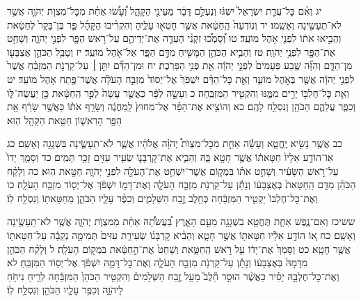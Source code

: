 \documentclass[twoside, openany, parskip=half, 11pt]{book}
\begin{document}
יג וְאִ֨ם כׇּל־עֲדַ֤ת יִשְׂרָאֵל֙ יִשְׁגּ֔וּ וְנֶעְלַ֣ם דָּבָ֔ר מֵעֵינֵ֖י הַקָּהָ֑ל וְ֠עָשׂ֠וּ אַחַ֨ת מִכׇּל־מִצְוֺ֧ת יְהֹוָ֛ה אֲשֶׁ֥ר לֹא־תֵעָשֶׂ֖ינָה וְאָשֵֽׁמוּ׃ יד וְנֽוֹדְעָה֙ הַֽחַטָּ֔את אֲשֶׁ֥ר חָטְא֖וּ עָלֶ֑יהָ וְהִקְרִ֨יבוּ הַקָּהָ֜ל פַּ֤ר בֶּן־בָּקָר֙ לְחַטָּ֔את וְהֵבִ֣יאוּ אֹת֔וֹ לִפְנֵ֖י אֹ֥הֶל מוֹעֵֽד׃ טו וְ֠סָמְכ֠וּ זִקְנֵ֨י הָעֵדָ֧ה אֶת־יְדֵיהֶ֛ם עַל־רֹ֥אשׁ הַפָּ֖ר לִפְנֵ֣י יְהֹוָ֑ה וְשָׁחַ֥ט אֶת־הַפָּ֖ר לִפְנֵ֥י יְהֹוָֽה׃ טז וְהֵבִ֛יא הַכֹּהֵ֥ן הַמָּשִׁ֖יחַ מִדַּ֣ם הַפָּ֑ר אֶל־אֹ֖הֶל מוֹעֵֽד׃ יז וְטָבַ֧ל הַכֹּהֵ֛ן אֶצְבָּע֖וֹ מִן־הַדָּ֑ם וְהִזָּ֞ה שֶׁ֤בַע פְּעָמִים֙ לִפְנֵ֣י יְהֹוָ֔ה אֵ֖ת פְּנֵ֥י הַפָּרֹֽכֶת׃ יח וּמִן־הַדָּ֞ם יִתֵּ֣ן ׀ עַל־קַרְנֹ֣ת הַמִּזְבֵּ֗חַ אֲשֶׁר֙ לִפְנֵ֣י יְהֹוָ֔ה אֲשֶׁ֖ר בְּאֹ֣הֶל מוֹעֵ֑ד וְאֵ֣ת כׇּל־הַדָּ֗ם יִשְׁפֹּךְ֙ אֶל־יְסוֹד֙ מִזְבַּ֣ח הָעֹלָ֔ה אֲשֶׁר־פֶּ֖תַח אֹ֥הֶל מוֹעֵֽד׃ יט וְאֵ֥ת כׇּל־חֶלְבּ֖וֹ יָרִ֣ים מִמֶּ֑נּוּ וְהִקְטִ֖יר הַמִּזְבֵּֽחָה׃ כ וְעָשָׂ֣ה לַפָּ֔ר כַּאֲשֶׁ֤ר עָשָׂה֙ לְפַ֣ר הַֽחַטָּ֔את כֵּ֖ן יַעֲשֶׂה־לּ֑וֹ וְכִפֶּ֧ר עֲלֵהֶ֛ם הַכֹּהֵ֖ן וְנִסְלַ֥ח לָהֶֽם׃ כא וְהוֹצִ֣יא אֶת־הַפָּ֗ר אֶל־מִחוּץ֙ לַֽמַּחֲנֶ֔ה וְשָׂרַ֣ף אֹת֔וֹ כַּאֲשֶׁ֣ר שָׂרַ֔ף אֵ֖ת הַפָּ֣ר הָרִאשׁ֑וֹן חַטַּ֥את הַקָּהָ֖ל הֽוּא׃

כב אֲשֶׁ֥ר נָשִׂ֖יא יֶֽחֱטָ֑א וְעָשָׂ֡ה אַחַ֣ת מִכׇּל־מִצְוֺת֩ יְהֹוָ֨ה אֱלֹהָ֜יו אֲשֶׁ֧ר לֹא־תֵעָשֶׂ֛ינָה בִּשְׁגָגָ֖ה וְאָשֵֽׁם׃ כג אֽוֹ־הוֹדַ֤ע אֵלָיו֙ חַטָּאת֔וֹ אֲשֶׁ֥ר חָטָ֖א בָּ֑הּ וְהֵבִ֧יא אֶת־קׇרְבָּנ֛וֹ שְׂעִ֥יר עִזִּ֖ים זָכָ֥ר תָּמִֽים׃ כד וְסָמַ֤ךְ יָדוֹ֙ עַל־רֹ֣אשׁ הַשָּׂעִ֔יר וְשָׁחַ֣ט אֹת֗וֹ בִּמְק֛וֹם אֲשֶׁר־יִשְׁחַ֥ט אֶת־הָעֹלָ֖ה לִפְנֵ֣י יְהֹוָ֑ה חַטָּ֖את הֽוּא׃ כה וְלָקַ֨ח הַכֹּהֵ֜ן מִדַּ֤ם הַֽחַטָּאת֙ בְּאֶצְבָּע֔וֹ וְנָתַ֕ן עַל־קַרְנֹ֖ת מִזְבַּ֣ח הָעֹלָ֑ה וְאֶת־דָּמ֣וֹ יִשְׁפֹּ֔ךְ אֶל־יְס֖וֹד מִזְבַּ֥ח הָעֹלָֽה׃ כו וְאֶת־כׇּל־חֶלְבּוֹ֙ יַקְטִ֣יר הַמִּזְבֵּ֔חָה כְּחֵ֖לֶב זֶ֣בַח הַשְּׁלָמִ֑ים וְכִפֶּ֨ר עָלָ֧יו הַכֹּהֵ֛ן מֵחַטָּאת֖וֹ וְנִסְלַ֥ח לֽוֹ׃

ששיכז וְאִם־נֶ֧פֶשׁ אַחַ֛ת תֶּחֱטָ֥א בִשְׁגָגָ֖ה מֵעַ֣ם הָאָ֑רֶץ בַּ֠עֲשֹׂתָ֠הּ אַחַ֨ת מִמִּצְוֺ֧ת יְהֹוָ֛ה אֲשֶׁ֥ר לֹא־תֵעָשֶׂ֖ינָה וְאָשֵֽׁם׃ כח א֚וֹ הוֹדַ֣ע אֵלָ֔יו חַטָּאת֖וֹ אֲשֶׁ֣ר חָטָ֑א וְהֵבִ֨יא קׇרְבָּנ֜וֹ שְׂעִירַ֤ת עִזִּים֙ תְּמִימָ֣ה נְקֵבָ֔ה עַל־חַטָּאת֖וֹ אֲשֶׁ֥ר חָטָֽא׃ כט וְסָמַךְ֙ אֶת־יָד֔וֹ עַ֖ל רֹ֣אשׁ הַֽחַטָּ֑את וְשָׁחַט֙ אֶת־הַ֣חַטָּ֔את בִּמְק֖וֹם הָעֹלָֽה׃ ל וְלָקַ֨ח הַכֹּהֵ֤ן מִדָּמָהּ֙ בְּאֶצְבָּע֔וֹ וְנָתַ֕ן עַל־קַרְנֹ֖ת מִזְבַּ֣ח הָעֹלָ֑ה וְאֶת־כׇּל־דָּמָ֣הּ יִשְׁפֹּ֔ךְ אֶל־יְס֖וֹד הַמִּזְבֵּֽחַ׃ לא וְאֶת־כׇּל־חֶלְבָּ֣הּ יָסִ֗יר כַּאֲשֶׁ֨ר הוּסַ֣ר חֵ֘לֶב֮ מֵעַ֣ל זֶ֣בַח הַשְּׁלָמִים֒ וְהִקְטִ֤יר הַכֹּהֵן֙ הַמִּזְבֵּ֔חָה לְרֵ֥יחַ נִיחֹ֖חַ לַיהֹוָ֑ה וְכִפֶּ֥ר עָלָ֛יו הַכֹּהֵ֖ן וְנִסְלַ֥ח לֽוֹ׃
\end{document}
